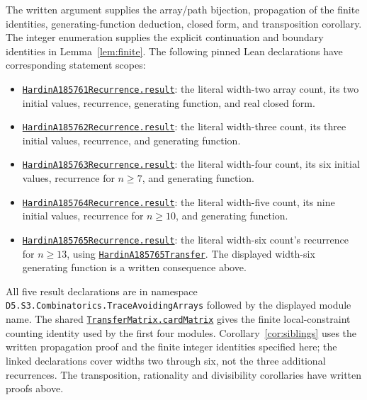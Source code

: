 \documentclass[11pt]{article}
\newcommand{\leanbase}{https://github.com/the-omega-institute/trureturing/blob/1a461fb83236b7d5f88b0ffd1bde5f7d1e3ff8b4/D5/S3/Combinatorics/TraceAvoidingArrays/}
\begin{document}
The written argument supplies the array/path bijection, propagation of
the finite identities, generating-function deduction, closed form, and
transposition corollary. The integer enumeration supplies the explicit
continuation and boundary identities in Lemma~\ref{lem:finite}.
The following pinned Lean declarations have corresponding statement scopes:
\begin{itemize}
\item \href{\leanbase HardinA185761Recurrence.lean}{\texttt{HardinA185761Recurrence.result}}:
the literal width-two array count, its two initial values, recurrence,
generating function, and real closed form.
\item \href{\leanbase HardinA185762Recurrence.lean}{\texttt{HardinA185762Recurrence.result}}:
the literal width-three count, its three initial values, recurrence, and
generating function.
\item \href{\leanbase HardinA185763Recurrence.lean}{\texttt{HardinA185763Recurrence.result}}:
the literal width-four count, its six initial values, recurrence for
$n\ge7$, and generating function.
\item \href{\leanbase HardinA185764Recurrence.lean}{\texttt{HardinA185764Recurrence.result}}:
the literal width-five count, its nine initial values, recurrence for
$n\ge10$, and generating function.
\item \href{\leanbase HardinA185765Recurrence.lean}{\texttt{HardinA185765Recurrence.result}}:
the literal width-six count's recurrence for $n\ge13$, using
\href{\leanbase HardinA185765Transfer.lean}{\texttt{HardinA185765Transfer}}.
The displayed width-six generating function is a written consequence
above.
\end{itemize}
All five result declarations are in namespace
\texttt{D5.S3.Combinatorics.TraceAvoidingArrays} followed by the displayed
module name. The shared
\href{\leanbase TransferMatrix.lean}{\texttt{TransferMatrix.cardMatrix}}
gives the finite local-constraint counting identity used by the first
four modules.
Corollary~\ref{cor:siblings} uses the written propagation proof and the
finite integer identities specified here; the linked declarations cover
widths two through six, not the three additional recurrences.
The transposition, rationality and divisibility corollaries have written
proofs above.
\end{document}
